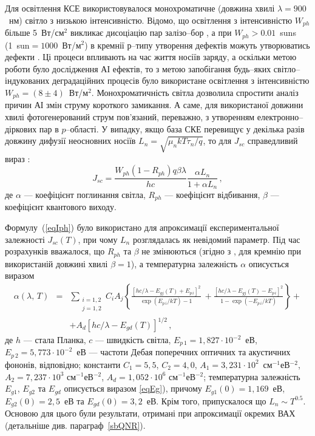 Для освітлення КСЕ використовувалося монохроматичне (довжина хвилі $\lambda=900$~нм) світло з низькою інтенсивністю.
Відомо, що освітлення з інтенсивністю $W_{ph}$ більше 5~Вт/см$^2$ викликає дисоціацію пар залізо--бор \cite{LID:CuII},
а при $W_{ph}>0.01$~suns (1~sun$=1000$~Вт/м$^2$) в кремнії р--типу утворення дефектів можуть утворюватись дефекти \cite{BO:Halam2016}.
Ці процеси впливають на час життя носіїв заряду, а оскільки метою роботи було дослідження АІ ефектів,
то з метою запобігання будь--яких світло--індукованих деградаційних процесів було використане
освітлення з інтенсивністю $W_{ph}=(8\pm4)$~Вт/м$^2$.
Монохроматичність світла дозволила спростити аналіз причин АІ змін струму короткого замикання.
А саме, для використаної довжини хвилі фотогенерований струм пов'язаний, переважно, з утворенням електронно--діркових пар в $p$--області.
У випадку, якщо база СКЕ перевищує у декілька разів довжину дифузії неосновних носіїв $L_n=\sqrt{\mu_nkT\tau_n/q}$, то
для $J_{sc}$ справедливий вираз \cite{Markvart,Razeghi,Faren}:
\begin{equation}
\label{eqIph}
J_{sc} = \frac{W_{ph}(1-R_{ph})q\beta\lambda}{hc}\frac{\alpha L_n}{1+ \alpha L_n}\,,
\end{equation}
де
$\alpha$ --- коефіцієнт поглинання світла,
$R_{ph}$ --- коефіцієнт відбивання,
$\beta$ --- коефіцієнт квантового виходу.

Формулу~(\ref{eqIph}) було використано для апроксимації експериментальної залежності $J_{sc}(T)$,
при чому $L_n$ розглядалась як невідомий параметр.
Під час розрахунків вважалося, що $R_{ph}$ та $\beta$ не змінюються (згідно з \cite{Gaman}, для кремнію
при використаній довжині хвилі $\beta=1$),
а температурна залежність $\alpha$ описується виразом \cite{Markvart,Si:Absorb}
\begin{eqnarray}
\label{eqAlpha}
\nonumber \alpha(\lambda,\,T)&=&\sum_{\substack{i=1,2\\j=1,2}}\!C_iA_j\left\{\frac{[hc/\lambda-E_{gj}(T)+E_{p\,i}]^2}{\exp(E_{p\,i}/kT)-1}\:+
\frac{[hc/\lambda-E_{gj}(T)-E_{p\,i}]^2}{1-\exp(-E_{p\,i}/kT)}\right\}+\\
&&+A_d\left[hc/\lambda-E_{gd}(T)\right]^{1/2}\,,
\end{eqnarray}
де
$h$ --- стала Планка,
$c$ --- швидкість світла,
$E_{p\,1}=1,827\cdot10^{-2}$~еВ,
$E_{p\,2}=5,773\cdot10^{-2}$~еВ --- частоти Дебая поперечних
оптичних та акустичних фононів, відповідно;
константи $C_1=5,5$,
$C_2=4,0$,
$A_1=3,231\cdot10^2$~см$^{-1}$еВ$^{-2}$,
$A_2=7,237\cdot10^3$ см$^{-1}$еВ$^{-2}$,
$A_d=1,052\cdot10^6$ см$^{-1}$еВ$^{-2}$;
температурна залежність $E_{g1}$, $E_{g2}$ та $E_{gd}$ описується виразом \ref{eqEg}),
причому $E_{g1}(0)=1,169$~еВ, $E_{g2}(0)=2,5$~еВ та $E_{gd}(0)=3,2$~еВ.
Крім того, припускалося що $L_n\sim T^{0.5}$.
Основою для цього були результати, отримані при апроксимації окремих ВАХ (детальніше див. параграф~\ref{sbQNR}).

